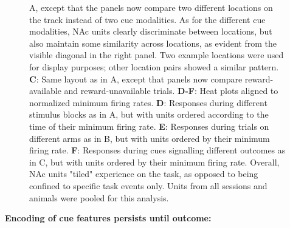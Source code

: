 \documentclass[11pt]{article}
\newcommand{\bsf}[1]{\textbf{#1}}
\begin{document}
{\begin{figure}[h]
{A, except that the panels now compare two different locations on the track
instead of two cue modalities. As for the different cue modalities, NAc units
clearly discriminate between locations, but also maintain some similarity
across locations, as evident from the visible diagonal in the right panel. Two
example locations were used for display purposes; other location pairs showed
a similar pattern. \bsf{C}: Same layout as in A, except that panels now
compare reward-available and reward-unavailable trials. \bsf{D-F}: Heat plots
aligned to normalized minimum firing rates. \bsf{D}: Responses during
different stimulus blocks as in A, but with units ordered according to the
time of their minimum firing rate. \bsf{E}: Responses during trials on
different arms as in B, but with units ordered by their minimum firing
rate. \bsf{F}: Responses during cues signalling different outcomes as in C,
but with units ordered by their minimum firing rate. Overall, NAc units
"tiled" experience on the task, as opposed to being confined to specific task
events only. Units from all sessions and animals were pooled for this
analysis.}
\label{fig:tiling}
\end{figure}

{\bf Encoding of cue features persists until outcome:}

}
\end{document}
